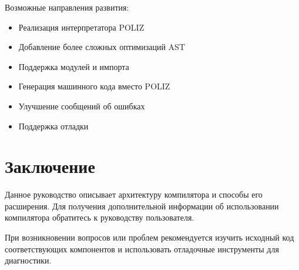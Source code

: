 \documentclass[12pt,a4paper]{article}
\begin{document}
Возможные направления развития:

\begin{itemize}
    \item Реализация интерпретатора POLIZ
    \item Добавление более сложных оптимизаций AST
    \item Поддержка модулей и импорта
    \item Генерация машинного кода вместо POLIZ
    \item Улучшение сообщений об ошибках
    \item Поддержка отладки
\end{itemize}

\section{Заключение}

Данное руководство описывает архитектуру компилятора и способы его расширения. Для получения дополнительной информации об использовании компилятора обратитесь к руководству пользователя.

При возникновении вопросов или проблем рекомендуется изучить исходный код соответствующих компонентов и использовать отладочные инструменты для диагностики.
\end{document}
